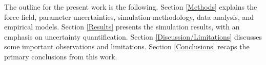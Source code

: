 \documentclass[preprint,review,12pt]{elsarticle}
\begin{document}
	
	
	
	The outline for the present work is the following. Section \ref{Methods} explains the force field, parameter uncertainties, simulation methodology, data analysis, and empirical models. Section \ref{Results} presents the simulation results, with an emphasis on uncertainty quantification. Section \ref{Discussion/Limitations} discusses some important observations and limitations. Section \ref{Conclusions} recaps the primary conclusions from this work.
	
\end{document}
